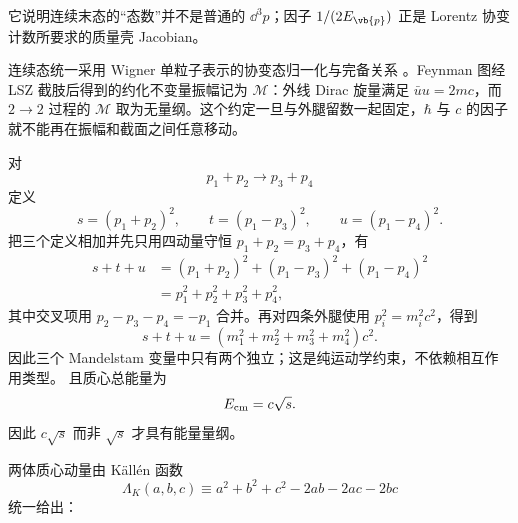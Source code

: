 它说明连续末态的“态数”并不是普通的 \(\dd^3 p\)；因子 \(1/(2E_{\vb{p}})\) 正是 Lorentz 协变计数所要求的质量壳 Jacobian。

连续态统一采用 Wigner 单粒子表示的协变态归一化与完备关系 。Feynman 图经 LSZ 截肢后得到的约化不变量振幅记为 \(\mathcal M\)：外线 Dirac 旋量满足 \(\bar uu=2mc\)，而 \(2\to2\) 过程的 \(\mathcal M\) 取为无量纲。这个约定一旦与外腿留数一起固定，\(\hbar\) 与 \(c\) 的因子就不能再在振幅和截面之间任意移动。

对
\begin{equation*}
 p_1+p_2\longrightarrow p_3+p_4
\end{equation*}
定义
\begin{equation}
 {
 s=(p_1+p_2)^2,
 \qquad
 t=(p_1-p_3)^2,
 \qquad
 u=(p_1-p_4)^2.}
 \label{eq:mandelstam-def-si-r9}
\end{equation}
把三个定义相加并先只用四动量守恒 $p_1+p_2=p_3+p_4$，有
\begin{align*}
s+t+u
&=(p_1+p_2)^2+(p_1-p_3)^2+(p_1-p_4)^2\\
&=p_1^2+p_2^2+p_3^2+p_4^2,
\end{align*}
其中交叉项用 $p_2-p_3-p_4=-p_1$ 合并。再对四条外腿使用 $p_i^2=m_i^2c^2$，得到
\begin{equation}
 {
 s+t+u=(m_1^2+m_2^2+m_3^2+m_4^2)c^2.}
 \label{eq:stu-sum-si-r9}
\end{equation}
因此三个 Mandelstam 变量中只有两个独立；这是纯运动学约束，不依赖相互作用类型。
且质心总能量为
\begin{equation}
 E_{\rm cm}=c\sqrt{s}.
 \label{eq:Ecm-s-si-r9}
\end{equation}
因此 \(c\sqrt s\) 而非 \(\sqrt s\) 才具有能量量纲。


两体质心动量由 Källén 函数
\begin{equation*}
 \Lambda_K(a,b,c)\equiv a^2+b^2+c^2-2ab-2ac-2bc
\end{equation*}
统一给出：


